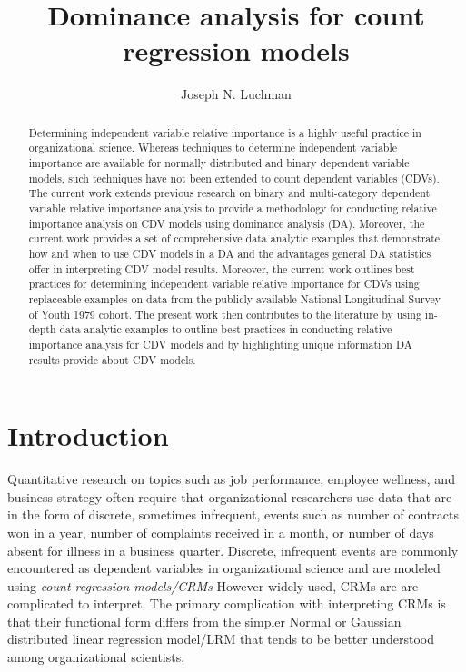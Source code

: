\documentclass[ShortAfour,times,sageapa]{sagej}
\begin{document}
	
\title{Dominance analysis for count regression models}
\author{Joseph N. Luchman}

\begin{abstract}
	Determining independent variable relative importance is a highly useful practice in organizational science.  Whereas techniques to determine independent variable importance are available for normally distributed and binary dependent variable models, such techniques have not been extended to count dependent variables (CDVs).  The current work extends previous research on binary and multi-category dependent variable relative importance analysis to provide a methodology for conducting relative importance analysis on CDV models using dominance analysis (DA).  Moreover, the current work provides a set of comprehensive data analytic examples that demonstrate how and when to use CDV models in a DA and the advantages general DA statistics offer in interpreting CDV model results.  Moreover, the current work outlines best practices for determining independent variable relative importance for CDVs using replaceable examples on data from the publicly available National Longitudinal Survey of Youth 1979 cohort.  The present work then contributes to the literature by using in-depth data analytic examples to outline best practices in conducting relative importance analysis for CDV models and by highlighting unique information DA results provide about CDV models.
\end{abstract}


\maketitle

\section{Introduction}

	Quantitative research on topics such as job performance, employee wellness, and business strategy often require that organizational researchers use data that are in the form of discrete, sometimes infrequent, events such as number of contracts won in a year, number of complaints received in a month, or number of days absent for illness in a business quarter. %
	Discrete, infrequent events are commonly encountered as dependent variables in organizational science \cite[e.g.,]{bettinazzi2021stakeholder,naumovska2021strength,soda2021networks} and are modeled using \textit{count regression models/CRMs}   %
	However widely used, CRMs are are complicated to interpret.
	The primary complication with interpreting CRMs is that their functional form differs from the simpler Normal or Gaussian distributed linear regression model/LRM that tends to be better understood among organizational scientists.  %
	 
\end{document}
